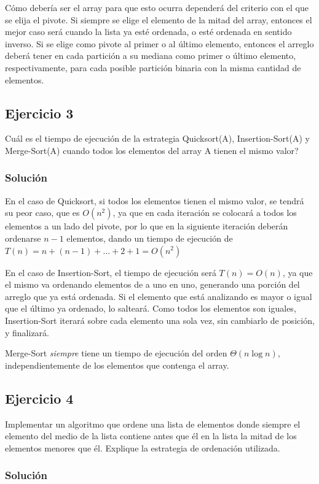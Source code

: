 \documentclass{article}
\begin{document}
Cómo debería ser el array para que esto ocurra dependerá del criterio con el que se elija el pivote. Si siempre se elige el elemento de la mitad del array, entonces el mejor caso será cuando la lista ya esté ordenada, o esté ordenada en sentido inverso. Si se elige como pivote al primer o al último elemento, entonces el arreglo deberá tener en cada partición a su mediana como primer o último elemento, respectivamente, para cada posible partición binaria con la misma cantidad de elementos.


\subsection*{Ejercicio 3}
Cuál es el tiempo de ejecución de la estrategia Quicksort(A), Insertion-Sort(A) y Merge-Sort(A) cuando todos los elementos del array A tienen el mismo valor?

\subsubsection*{Solución}
En el caso de Quicksort, si todos los elementos tienen el mismo valor, se tendrá su peor caso, que es $O(n^2)$, ya que en cada iteración se colocará a todos los elementos a un lado del pivote, por lo que en la siguiente iteración deberán ordenarse $n-1$ elementos, dando un tiempo de ejecución de $T(n) = n + (n-1) + \dots + 2 + 1 = O(n^2)$

En el caso de Insertion-Sort, el tiempo de ejecución será $T(n) = O(n)$, ya que el mismo va ordenando elementos de a uno en uno, generando una porción del arreglo que ya está ordenada. Si el elemento que está analizando es mayor o igual que el último ya ordenado, lo salteará. Como todos los elementos son iguales, Insertion-Sort iterará sobre cada elemento una sola vez, sin cambiarlo de posición, y finalizará.

Merge-Sort {\em siempre} tiene un tiempo de ejecución del orden $\Theta (n \log n)$, independientemente de los elementos que contenga el array.


\subsection*{Ejercicio 4}
Implementar un algoritmo que ordene una lista de elementos donde siempre el elemento del medio de la lista contiene antes que él en la lista la mitad de los elementos menores que él. Explique la estrategia de ordenación utilizada.

\subsubsection*{Solución}
\end{document}
